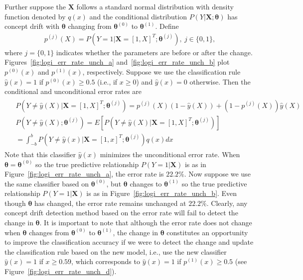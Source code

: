 \documentclass[twoside,11pt]{article}
\begin{document}
Further suppose the $\bm{X}$ follows a standard normal distribution with density function denoted by $q(x)$ and the conditional distribution $P(Y|\bm{X};\bm{\theta})$ has concept drift with $\bm{\theta}$ changing from $\bm{\theta}^{(0)}$ to $\bm{\theta}^{(1)}$. Define 
\begin{align}
p^{(j)}(X)=P(Y=1|\bm{X}=[1,X]^T;\bm{\theta}^{(j)}),~j\in\{0,1\},
\label{eqn:simp_nota_p}
\end{align}
where $j=\{0,1\}$ indicates whether the parameters are before or after the change. Figures~\ref{fig:logi_err_rate_unch_a} and~\ref{fig:logi_err_rate_unch_b} plot $p^{(0)}(x)$ and $p^{(1)}(x)$, respectively. Suppose we use the classification rule $\hat{y}(x)=1$ if $p^{(0)}(x)\geq 0.5$ (i.e., if $x\geq 0 $) and $\hat{y}(x)=0$ otherwise. Then the conditional and unconditional error rates are
\begin{align}
\begin{aligned}
&P(Y\neq\hat{y}(X)|\bm{X}=[1,X]^T;\bm{\theta}^{(j)})
= p^{(j)}(X)(1-\hat{y}(X)) + (1-p^{(j)}(X))\hat{y}(X) \\
&P(Y\neq\hat{y}(X);\bm{\theta}^{(j)}) = E[P(Y\neq\hat{y}(X)|\bm{X}=[1,X]^T;\bm{\theta}^{(j)})] \\ &= \int_{-b}^{b}P(Y\neq\hat{y}(x)|\bm{X}=[1,x]^T;\bm{\theta}^{(j)})q(x)dx
\end{aligned}
\label{eqn:logi_err_rate}
\end{align}
Note that this classifier $\hat{y}(x)$ minimizes the unconditional error rate. When $\bm{\theta} = \bm{\theta}^{(0)}$ so the true predictive relationship $P(Y=1|\bm{X})$ is as in Figure~\ref{fig:logi_err_rate_unch_a}, the error rate is $22.2\%$. Now suppose we use the same classifier based on $\bm{\theta}^{(0)}$, but $\bm{\theta}$ changes to $\bm{\theta}^{(1)}$ so the true predictive relationship $P(Y=1|\bm{X})$ is as in Figure~\ref{fig:logi_err_rate_unch_b}. Even though $\bm{\theta}$ has changed, the error rate remains unchanged at $22.2\%$. Clearly, any concept drift detection method based on the error rate will fail to detect the change in $\bm{\theta}$. It is important to note that although the error rate does not change when $\bm{\theta}$ changes from $\bm{\theta}^{(0)}$ to $\bm{\theta}^{(1)}$, the change in $\bm{\theta}$ constitutes an opportunity to improve the classification accuracy if we were to detect the change and update the classification rule based on the new model, i.e., use the new classifier $\hat{y}(x)=1$ if $x \geq 0.59$, which corresponds to $\hat{y}(x)=1$ if $p^{(1)}(x)\geq 0.5$ (see Figure~\ref{fig:logi_err_rate_unch_d}).
\end{document}
